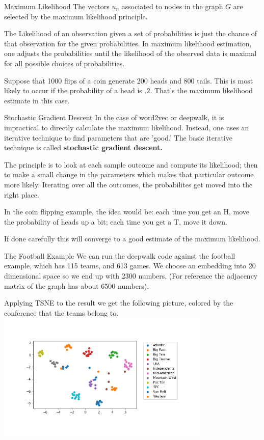 \documentclass{beamer}
\begin{document}
  \begin{frame}{Maximum Likelihood}
    The vectors $u_n$ associated to nodes in the graph $G$ are selected by the maximum likelihood principle.

    \bigskip\noindent
    The Likelihood of an observation given a set of probabilities is just the chance of that observation for the given probabilities. In maximum likelihood estimation, one adjusts the probabilities until the likelihood of the observed data is maximal for all possible choices of probabilities.

    \bigskip\noindent
    Suppose that  1000 flips of a coin generate 200 heads and 800 tails.  This is most likely to occur if the probability of a head is $.2$.  That's the maximum likelihood estimate in this case.
  \end{frame}
  \begin{frame}{Stochastic Gradient Descent}
    In the case of word2vec or deepwalk, it is impractical to  directly calculate the maximum likelihood. Instead, one uses an iterative technique to find parameters that are 'good.'  The basic iterative technique is called \textbf{stochastic gradient descent.}

    \bigskip\noindent
    The principle is to look at each sample outcome and compute its likelihood; then to make a small change in the parameters which makes that particular outcome more likely.  Iterating over all the outcomes, the probabilites get moved into the right place.

    \bigskip\noindent
    In the coin flipping example, the idea would be: each time you get an H, move the probability of heads up a bit; each time you get a T, move it down.

    \bigskip\noindent
    If done carefully this will converge to a good estimate of the maximum likelihood.
  \end{frame}
  \begin{frame}{The Football Example}
    We can run the deepwalk code against the football example, which has 115 teams, and 613 games.  We choose
    an embedding into 20 dimensional space so we end up with 2300 numbers.
    (For reference the adjacency matrix of the graph has about 6500 numbers).

    Applying TSNE to the result we get the following picture, colored by the conference that the teams belong to.
    \includegraphics[width=4in]{football_clusters.png}

 \end{frame}
  
    
    
    
\end{document}

